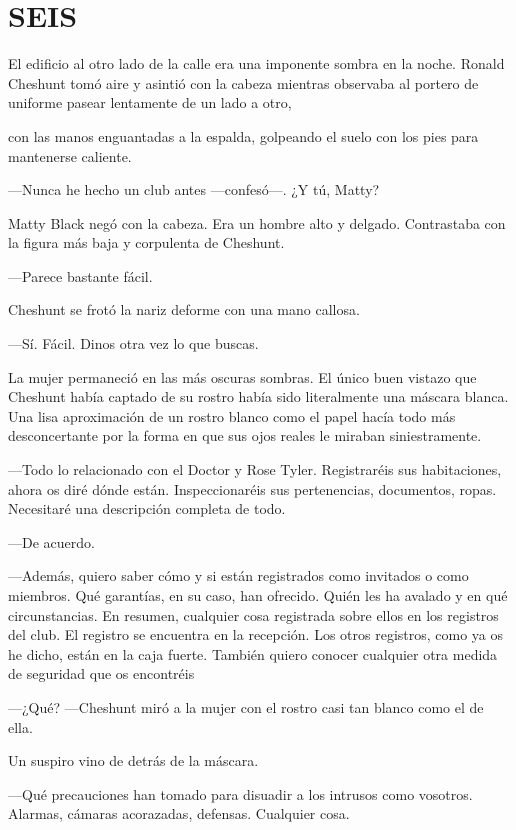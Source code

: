 \chapter*{SEIS}

{El edificio al otro lado de la calle era una imponente sombra en la
	noche. Ronald Cheshunt tomó aire y asintió con la cabeza mientras
observaba al portero de uniforme pasear lentamente de un lado a otro,}

{con las manos enguantadas a la espalda, golpeando el suelo con los pies
para mantenerse caliente.}

{---Nunca he hecho un club antes ---confesó---. ¿Y tú, Matty?}

{Matty Black negó con la cabeza. Era un hombre alto y delgado.
Contrastaba con la figura más baja y corpulenta de Cheshunt.}

{---Parece bastante fácil.}

{Cheshunt se frotó la nariz deforme con una mano callosa.}

{---Sí. Fácil. Dinos otra vez lo que buscas.}

{La mujer permaneció en las más oscuras sombras. El único buen vistazo
	que Cheshunt había captado de su rostro había sido literalmente una
	máscara blanca. Una lisa aproximación de un rostro blanco como el papel
	hacía todo más desconcertante por la forma en que sus ojos reales le
miraban siniestramente.}

{---Todo lo relacionado con el Doctor y Rose Tyler. Registraréis sus
	habitaciones, ahora os diré dónde están. Inspeccionaréis sus
	pertenencias, documentos, ropas. Necesitaré una descripción completa de
todo.}

{---De acuerdo.}

{---Además, quiero saber cómo y si están registrados como invitados o
	como miembros. Qué garantías, en su caso, han ofrecido. Quién les ha
	avalado y en qué circunstancias. En resumen, cualquier cosa registrada
	sobre ellos en los registros del club. El registro se encuentra en la
	recepción. Los otros registros, como ya os he dicho, están en la caja
	fuerte. También quiero conocer cualquier otra medida de seguridad que os
encontréis}

{---¿Qué? ---Cheshunt miró a la mujer con el rostro casi tan blanco como
el de ella.}

{Un suspiro vino de detrás de la máscara.}

{---Qué precauciones han tomado para disuadir a los intrusos como
vosotros. Alarmas, cámaras acorazadas, defensas. Cualquier cosa.}

